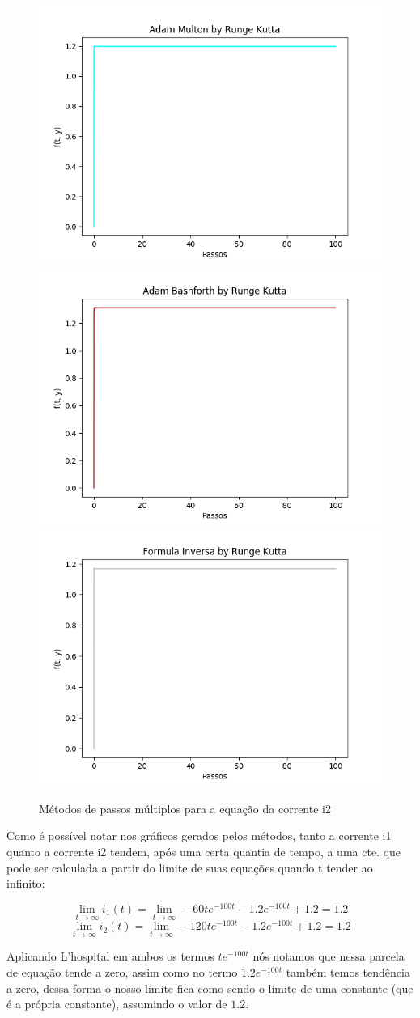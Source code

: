 \documentclass[12pt]{article}%
\begin{document}
    \begin{figure}[H]
        \begin{center}
            \includegraphics[width=.4\textwidth]{problemas/metodos_q2/circuito2_multon.png}
            \includegraphics[width=.4\textwidth]{problemas/metodos_q2/circuito2_bashforth.png}
            \includegraphics[width=.4\textwidth]{problemas/metodos_q2/circuito2_inversa.png}
        \end{center}
        \caption{Métodos de passos múltiplos para a equação da corrente i2}
    \end{figure}
    
    Como é possível notar nos gráficos gerados pelos métodos, tanto a corrente i1 quanto a corrente i2 tendem, após uma certa quantia de tempo, a uma cte. que pode ser calculada a partir do limite de suas equações quando t tender ao infinito:
    
    \[\lim_{t\to\infty} i_{1}(t) = \lim_{t\to\infty} -60te^{-100t}-1.2e^{-100t} + 1.2 = 1.2\]
    \[\lim_{t\to\infty} i_{2}(t) = \lim_{t\to\infty} -120te^{-100t}-1.2e^{-100t} + 1.2 = 1.2\]
    
    Aplicando L'hospital em ambos os termos \(te^{-100t}\) nós notamos que nessa parcela de equação tende a zero, assim como no termo \(1.2e^{-100t}\) também temos tendência a zero, dessa forma o nosso limite fica como sendo o limite de uma constante (que é a própria constante), assumindo o valor de \(1.2\).
    
\end{document}
